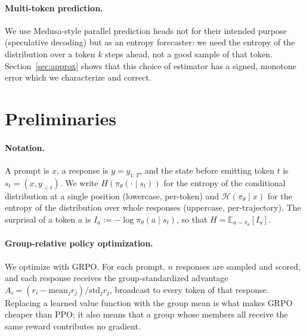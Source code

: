 \documentclass[11pt]{article}
\newcommand{\Htraj}{\mathcal{H}}
\newcommand{\E}{\mathbb{E}}
\newcommand{\pit}{\pi_{\theta}}
\begin{document}
\paragraph{Multi-token prediction.}
We use Medusa-style parallel prediction heads \citep{medusa} not for their intended
purpose (speculative decoding) but as an entropy forecaster: we need the entropy of
the distribution over a token $k$ steps ahead, not a good sample of that token.
Section~\ref{sec:approx} shows that this choice of estimator has a signed,
monotone error which we characterize and correct.

\section{Preliminaries}
\label{sec:prelim}

\paragraph{Notation.}
A prompt is $x$, a response is $y = y_{1:T}$, and the state before emitting token
$t$ is $s_t = (x, y_{<t})$. We write $H(\pit(\cdot \mid s_t))$ for the entropy of
the conditional distribution at a single position (lowercase, per-token) and
$\Htraj(\pit \mid x)$ for the entropy of the distribution over whole responses
(uppercase, per-trajectory). The surprisal of a token $a$ is
$I_a := -\log \pit(a \mid s_t)$, so that $H = \E_{a \sim \pit}[I_a]$.

\paragraph{Group-relative policy optimization.}
We optimize with GRPO. For each prompt, $n$ responses are sampled and scored, and
each response receives the group-standardized advantage
$A_i = (r_i - \mathrm{mean}_j r_j) / \mathrm{std}_j r_j$, broadcast to every token
of that response. Replacing a learned value function with the group mean is what
makes GRPO cheaper than PPO; it also means that a group whose members all receive
the same reward contributes no gradient.
\end{document}
